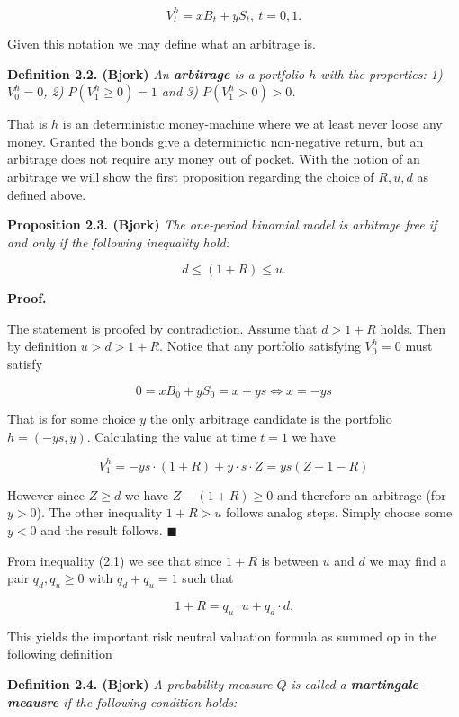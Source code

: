 \documentclass[
]{book}
\begin{document}
\[V^h_t=xB_t+yS_t,\ t=0,1.\]

Given this notation we may define what an arbitrage is.

\textbf{Definition 2.2. (Bjork)} \emph{An \textbf{arbitrage} is a portfolio \(h\) with the properties: 1) \(V^h_0=0\), 2) \(P(V^h_1\ge 0)=1\) and 3) \(P(V^h_1>0)>0\).}

That is \(h\) is an deterministic money-machine where we at least never loose any money. Granted the bonds give a determinictic non-negative return, but an arbitrage does not require any money out of pocket. With the notion of an arbitrage we will show the first proposition regarding the choice of \(R,u,d\) as defined above.

\textbf{Proposition 2.3. (Bjork)} \emph{The one-period binomial model is arbitrage free if and only if the following inequality hold:}

\[d\le (1+R)\le u.\tag{2.1}\]

\noindent\makebox[\linewidth]{\rule{\textwidth}{0.4pt}}

\textbf{Proof.}

The statement is proofed by contradiction. Assume that \(d>1+R\) holds. Then by definition \(u>d>1+R\). Notice that any portfolio satisfying \(V_0^h=0\) must satisfy

\[0=xB_0+yS_0=x+ys\iff x=-ys\]

That is for some choice \(y\) the only arbitrage candidate is the portfolio \(h=(-ys,y)\). Calculating the value at time \(t=1\) we have

\[V_1^h=-ys\cdot(1+R)+y\cdot s\cdot Z=ys(Z-1-R)\]

However since \(Z\ge d\) we have \(Z-(1+R)\ge 0\) and therefore an arbitrage (for \(y>0\)). The other inequality \(1+R>u\) follows analog steps. Simply choose some \(y<0\) and the result follows. \(\blacksquare\)

\noindent\makebox[\linewidth]{\rule{\textwidth}{0.4pt}}
From inequality (2.1) we see that since \(1+R\) is between \(u\) and \(d\) we may find a pair \(q_d,q_u\ge 0\) with \(q_d+q_u=1\) such that

\[1+R=q_u\cdot u+q_d\cdot d.\]

This yields the important risk neutral valuation formula as summed op in the following definition

\textbf{Definition 2.4. (Bjork)} \emph{A probability measure \(Q\) is called a \textbf{martingale meausre} if the following condition holds:}
\end{document}
